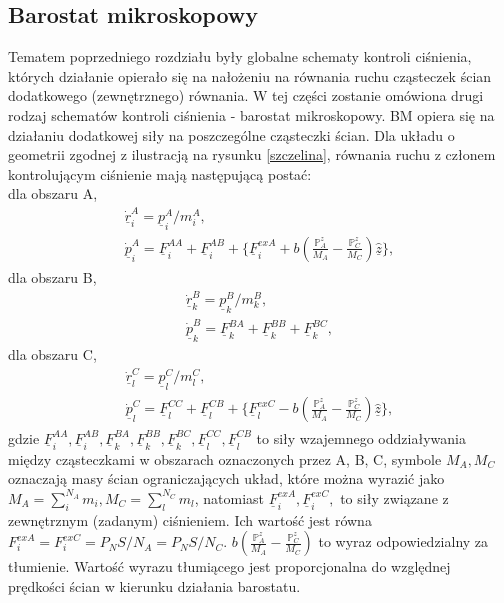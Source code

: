 \documentclass[12pt,a4paper,openright]{report} %
\begin{document}
\subsection{Barostat mikroskopowy}
%
Tematem poprzedniego rozdziału były globalne schematy kontroli ciśnienia, których działanie opierało się na nałożeniu na równania ruchu cząsteczek ścian dodatkowego (zewnętrznego) równania. W tej części zostanie omówiona drugi rodzaj schematów kontroli ciśnienia - barostat mikroskopowy. BM opiera się na działaniu dodatkowej siły na poszczególne cząsteczki ścian. Dla układu o geometrii zgodnej z ilustracją na rysunku \ref{szczelina}, równania ruchu z członem kontrolującym ciśnienie mają następującą postać:%
\\
dla obszaru A,
%
\begin{equation}
\begin{gathered}
\underline{\dot{r}}^A_i=\underline{p}^A_i/m_i^A,
%
\\
%
\underline{\dot{p}}^A_i=\underline{F}^{AA}_i +
\underline{F}^{AB}_i +
\underset{\text{ }}{\Bigg\{ \underline{F}^{exA}_i + b \left(\frac{\mathbb{P}^z_A}{M_A} - \frac{\mathbb{P}^z_C}{M_C} \right) \hat{\underline{z}} \Bigg\}},
\label{eq:b2}
\end{gathered}
\end{equation}
%
dla obszaru B,
%
\begin{equation}
\begin{gathered}
\underline{\dot{r}}^B_k=\underline{p}^B_k/m_k^B,
\\
\underline{\dot{p}}^B_k=\underline{F}^{BA}_k +
\underline{F}^{BB}_k + \underline{F}^{BC}_k,
\label{eq:b4}
\end{gathered}
\end{equation}
%
dla obszaru C,
%
\begin{equation}
\begin{gathered}
\underline{\dot{r}}^C_l=\underline{p}^C_l/m_l^C,
\\
\underline{\dot{p}}^C_l=\underline{F}^{CC}_l +
\underline{F}^{CB}_l +
\underset{\text{ }}{\Bigg\{ \underline{F}^{exC}_l - b \left( \frac{\mathbb{P}^z_A}{M_A} - \frac{\mathbb{P}^z_C}{M_C} \right) \hat{\underline{z}} \Bigg\}},
\label{eq:b6}
\end{gathered}
\end{equation}
%
gdzie $\underline{F}^{AA}_i, \underline{F}^{AB}_i, \underline{F}^{BA}_k, \underline{F}^{BB}_k, \underline{F}^{BC}_k, \underline{F}^{CC}_l, \underline{F}^{CB}_l$ to siły wzajemnego oddziaływania między cząsteczkami w obszarach oznaczonych przez A, B, C, symbole $M_A, M_C$ oznaczają masy ścian ograniczających układ, które można wyrazić jako $M_A=\sum_{i}^{N_A}{m_i}, M_C=\sum_{l}^{N_C}{m_l}$, natomiast $\underline{F}_i^{exA}, \underline{F}_i^{exC},$ to siły związane z zewnętrznym (zadanym) ciśnieniem. Ich wartość jest równa $F_i^{exA}=F_i^{exC}=P_N S/N_A=P_N S/N_C$. $b \left( \frac{\mathbb{P}^z_A}{M_A} - \frac{\mathbb{P}^z_C}{M_C} \right)$ to wyraz odpowiedzialny za tłumienie. Wartość wyrazu tłumiącego jest proporcjonalna do względnej prędkości ścian w kierunku działania barostatu. 
\end{document}
